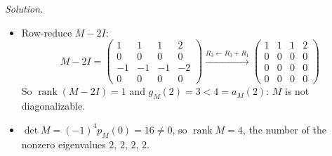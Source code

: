 \documentclass[12pt]{article}
\DeclareMathOperator{\rank}{rank}
\theoremstyle{definition}
\newenvironment{solution}{\par\noindent\textit{Solution.}\ }{\par\smallskip}
\begin{document}
\begin{solution}
\begin{itemize}
\[\begin{aligned}
=(t-2)\det\begin{pmatrix}t-3&-1&-2\\1&t-1&2\\0&0&t-2\end{pmatrix}\\
&=(t-2)^2\det\begin{pmatrix}t-3&-1\\1&t-1\end{pmatrix}=(t-2)^2(t^2-4t+4)=(t-2)^4
\end{aligned}
\]
So \(2\) is the only eigenvalue, with \(a_M(2)=4\).
\item Row-reduce \(M-2I\):
\[
M-2I=\begin{pmatrix}1&1&1&2\\0&0&0&0\\-1&-1&-1&-2\\0&0&0&0\end{pmatrix}
\xrightarrow{R_3\leftarrow R_3+R_1}
\begin{pmatrix}1&1&1&2\\0&0&0&0\\0&0&0&0\\0&0&0&0\end{pmatrix}
\]
So \(\rank(M-2I)=1\) and \(g_M(2)=3<4=a_M(2)\): \(M\) is not diagonalizable.
\item \(\det M=(-1)^4p_M(0)=16\ne0\), so \(\rank M=4\), the number of the nonzero eigenvalues \(2\), \(2\), \(2\), \(2\).
\end{itemize}
\end{solution}
\end{document}
